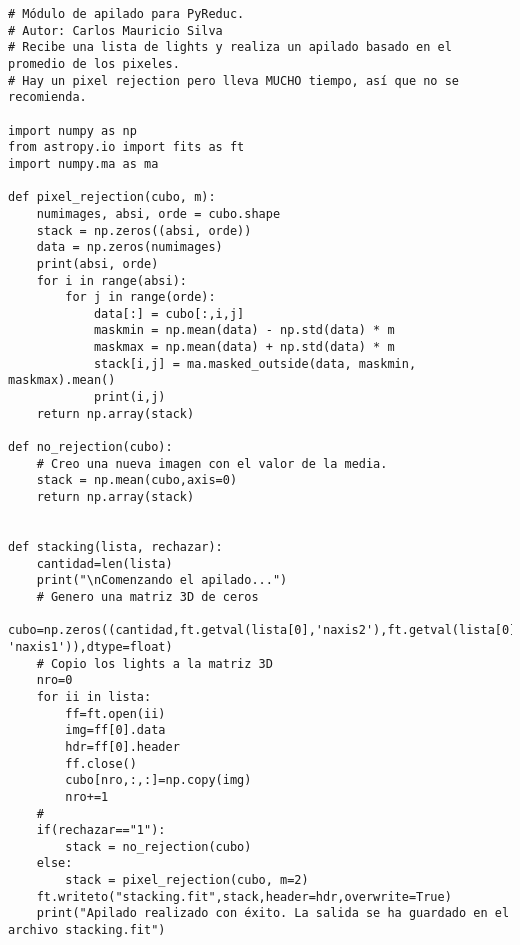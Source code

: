 \begin{lstlisting}[style=python]
# Módulo de apilado para PyReduc.
# Autor: Carlos Mauricio Silva
# Recibe una lista de lights y realiza un apilado basado en el promedio de los pixeles.
# Hay un pixel rejection pero lleva MUCHO tiempo, así que no se recomienda.

import numpy as np
from astropy.io import fits as ft
import numpy.ma as ma

def pixel_rejection(cubo, m):
    numimages, absi, orde = cubo.shape
    stack = np.zeros((absi, orde))
    data = np.zeros(numimages)
    print(absi, orde)
    for i in range(absi):
        for j in range(orde):
            data[:] = cubo[:,i,j]
            maskmin = np.mean(data) - np.std(data) * m
            maskmax = np.mean(data) + np.std(data) * m
            stack[i,j] = ma.masked_outside(data, maskmin, maskmax).mean()
            print(i,j)
    return np.array(stack)

def no_rejection(cubo):
    # Creo una nueva imagen con el valor de la media.
    stack = np.mean(cubo,axis=0)
    return np.array(stack)


def stacking(lista, rechazar):
    cantidad=len(lista)
    print("\nComenzando el apilado...")
    # Genero una matriz 3D de ceros
    cubo=np.zeros((cantidad,ft.getval(lista[0],'naxis2'),ft.getval(lista[0], 'naxis1')),dtype=float)
    # Copio los lights a la matriz 3D
    nro=0
    for ii in lista:
        ff=ft.open(ii)
        img=ff[0].data
        hdr=ff[0].header
        ff.close()
        cubo[nro,:,:]=np.copy(img)
        nro+=1
    #
    if(rechazar=="1"):
        stack = no_rejection(cubo)
    else:
        stack = pixel_rejection(cubo, m=2)
    ft.writeto("stacking.fit",stack,header=hdr,overwrite=True)
    print("Apilado realizado con éxito. La salida se ha guardado en el archivo stacking.fit")
\end{lstlisting}
